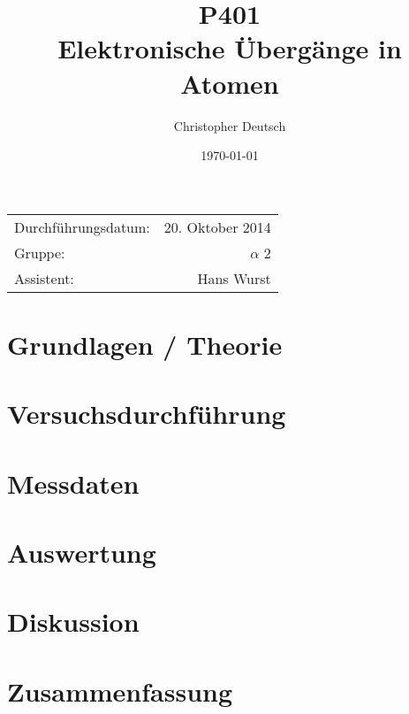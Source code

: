 \documentclass[10pt, a4paper]{article}
\title{P401 \\ Elektronische Übergänge in Atomen}
\author{Christopher Deutsch}
\date{\today}
\begin{document}
  
\maketitle

\begin{center}
\begin{tabular}{l r}
Durchführungsdatum: & 20. Oktober 2014 \\
Gruppe: & $\alpha$ 2 \\
Assistent: & Hans Wurst
\end{tabular}
\end{center}


\begin{abstract}
\end{abstract}

\section{Grundlagen / Theorie}

\section{Versuchsdurchführung}

\section{Messdaten}

\section{Auswertung}

\section{Diskussion}

\section{Zusammenfassung}

\end{document}

